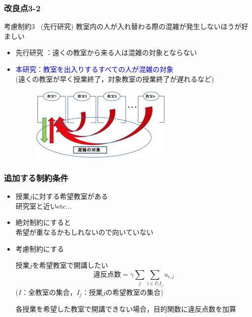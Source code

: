 \documentclass[dvipdfmx,12pt]{beamer}
\newcommand{\backupend}{
  \addtocounter{framenumberappendix}{-\value{framenumber}}
  \addtocounter{framenumber}{\value{framenumberappendix}} 
}
\begin{document}
\begin{frame}\frametitle{改良点3-2}
\begin{itembox}[l]{考慮制約3 \ (先行研究)}
教室内の人が入れ替わる際の混雑が発生しないほうが好ましい\\
\vspace{-15pt}
\end{itembox}
\vspace{-15pt}
\begin{itemize}
\item 先行研究 ：遠くの教室から来る人は混雑の対象とならない\\
\item \textcolor{blue}{本研究：教室を出入りするすべての人が混雑の対象}\\
(遠くの教室が早く授業終了，対象教室の授業終了が遅れるなど)\\

\begin{figure}

		\includegraphics[width=7cm]{kouryo3_new8.eps}
	
\end{figure}
\end{itemize}
\end{frame}


\begin{frame}\frametitle{追加する制約条件}
\begin{itemize}

\item 授業$j$に対する希望教室がある　\\
研究室と近いetc...\\
\item 絶対制約にすると\\
希望が重なるかもしれないので向いていない\\
\item 考慮制約にする

\begin{block}{授業$j$を希望教室で開講したい}
\[\text{違反点数} = \gamma \sum_j\sum_{i \in I \setminus I_j}u_{i,j} \]
\qquad \qquad ($I$：全教室の集合，$I_j$：授業$j$の希望教室の集合)
\end{block}
各授業を希望した教室で開講できない場合，目的関数に違反点数を加算

\end{itemize}
\end{frame}




\backupend
\end{document}
